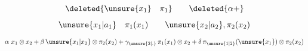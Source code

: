 \[
\deleted{\unsure{x_1}\quad\pi_1}\qquad\deleted{\alpha+}
\]
\[
\unsure{x_1|a_1}\quad\pi_1(x_1)\qquad \unsure{x_2|a_2},\pi_2(x_2)
\]
\[
\alpha\ x_1\otimes x_2+\beta\,\unsure{x_1|x_2}\otimes\pi_2(x_2)
+\gamma_{\unsure{2|.}}\,\pi_1(x_1)\otimes x_2+\delta\,\pi_{\unsure{1|2}}(\unsure{x_1})\otimes\pi_2(x_2)
\]
